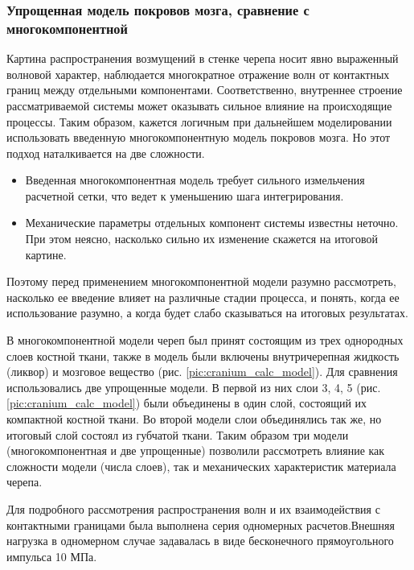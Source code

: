 \clearpage
\newpage

\subsubsection{Упрощенная модель покровов мозга, сравнение с многокомпонентной}

Картина распространения возмущений в стенке черепа носит явно выраженный волновой характер, наблюдается многократное отражение волн от контактных границ между отдельными компонентами. Соответственно, внутреннее строение рассматриваемой системы может оказывать сильное влияние на происходящие процессы. Таким образом, кажется логичным при дальнейшем моделировании использовать введенную многокомпонентную модель покровов мозга. Но этот подход наталкивается на две сложности.

\begin{itemize}

\item Введенная многокомпонентная модель требует сильного измельчения расчетной сетки, что ведет к уменьшению шага интегрирования.

\item Механические параметры отдельных компонент системы известны неточно. При этом неясно, насколько сильно их изменение скажется на итоговой картине.

\end{itemize}

Поэтому перед применением многокомпонентной модели разумно рассмотреть, насколько ее введение влияет на различные стадии процесса, и понять, когда ее использование разумно, а когда будет слабо сказываться на итоговых результатах.

В многокомпонентной модели череп был принят состоящим из трех однородных слоев костной ткани, также в модель были включены внутричерепная жидкость (ликвор) и мозговое вещество (рис. \ref{pic:cranium_calc_model}). Для сравнения использовались две упрощенные модели. В первой из них слои 3, 4, 5 (рис. \ref{pic:cranium_calc_model}) были объединены в один слой, состоящий их компактной костной ткани. Во второй модели слои объединялись так же, но итоговый слой состоял из губчатой ткани. Таким образом три модели (многокомпонентная и две упрощенные) позволили рассмотреть влияние как сложности модели (числа слоев), так и механических характеристик материала черепа.

Для подробного рассмотрения распространения волн и их взаимодействия с контактными границами была выполнена серия одномерных расчетов.Внешняя нагрузка в одномерном случае задавалась в виде бесконечного прямоугольного импульса 10 МПа.

